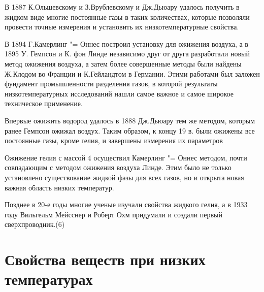 \documentclass[bachelor,och,referat]{SCWorks_corrected}
\begin{document}
В 1887 К.Ольшевскому и З.Врублевскому и Дж.Дьюару удалось получить в жидком виде многие постоянные газы в таких количествах, которые позволяли провести точные измерения и установить их низкотемпературные свойства.

В 1894 Г.Камерлинг "= Оннес построил установку для ожижения воздуха, а в 1895 У. Гемпсон и К. фон Линде независимо друг от друга разработали новый метод ожижения воздуха, а затем более совершенные методы были найдены Ж.Клодом во Франции и К.Гейландтом в Германии. Этими работами был заложен фундамент промышленности разделения газов, в которой результаты низкотемпературных исследований нашли самое важное и самое широкое техническое применение.

Впервые ожижить водород удалось в 1888 Дж.Дьюару тем же методом, которым ранее Гемпсон ожижал воздух. Таким образом, к концу 19 в. были ожижены все постоянные газы, кроме гелия, и завершены измерения их параметров

Ожижение гелия с массой 4 осуществил Камерлинг "= Оннес методом, почти совпадающим с методом ожижения воздуха Линде. Этим было не только установлено существование жидкой фазы для всех газов, но и открыта новая важная область низких температур.

Позднее в 20-е годы многие ученые изучали свойства жидкого гелия, а в 1933 году Вильгельм Мейсснер и Роберт Охм придумали и создали первый сверхпроводник.(6)


\section{Свойства веществ при низких температурах}
\end{document}

